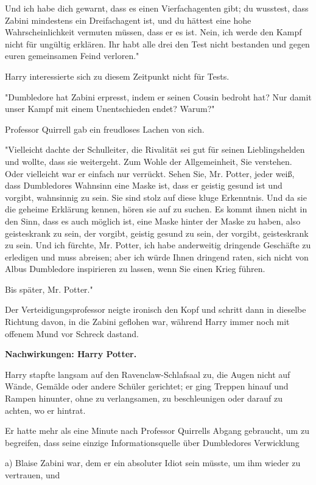 {Und ich habe dich gewarnt, dass es einen Vierfachagenten gibt; du wusstest, dass Zabini mindestens ein Dreifachagent ist, und du hättest eine hohe Wahrscheinlichkeit vermuten müssen, dass er es ist. Nein, ich werde den Kampf nicht für ungültig erklären. Ihr habt alle drei den Test nicht bestanden und gegen euren gemeinsamen Feind verloren."

Harry interessierte sich zu diesem Zeitpunkt nicht für Tests.

"Dumbledore hat Zabini erpresst, indem er seinen Cousin bedroht hat? Nur damit unser Kampf mit einem Unentschieden endet? Warum?"

Professor Quirrell gab ein freudloses Lachen von sich.

"Vielleicht dachte der Schulleiter, die Rivalität sei gut für seinen Lieblingshelden und wollte, dass sie weitergeht. Zum Wohle der Allgemeinheit, Sie verstehen. Oder vielleicht war er einfach nur verrückt. Sehen Sie, Mr. Potter, jeder weiß, dass Dumbledores Wahnsinn eine Maske ist, dass er geistig gesund ist und vorgibt, wahnsinnig zu sein. Sie sind stolz auf diese kluge Erkenntnis. Und da sie die geheime Erklärung kennen, hören sie auf zu suchen. Es kommt ihnen nicht in den Sinn, dass es auch möglich ist, eine Maske hinter der Maske zu haben, also geisteskrank zu sein, der vorgibt, geistig gesund zu sein, der vorgibt, geisteskrank zu sein. Und ich fürchte, Mr. Potter, ich habe anderweitig dringende Geschäfte zu erledigen und muss abreisen; aber ich würde Ihnen dringend raten, sich nicht von Albus Dumbledore inspirieren zu lassen, wenn Sie einen Krieg führen.

Bis später, Mr. Potter."

Der Verteidigungsprofessor neigte ironisch den Kopf und schritt dann in dieselbe Richtung davon, in die Zabini geflohen war, während Harry immer noch mit offenem Mund vor Schreck dastand.

\textbf{Nachwirkungen: Harry Potter.}

Harry stapfte langsam auf den Ravenclaw-Schlafsaal zu, die Augen nicht auf Wände, Gemälde oder andere Schüler gerichtet; er ging Treppen hinauf und Rampen hinunter, ohne zu verlangsamen, zu beschleunigen oder darauf zu achten, wo er hintrat.

Er hatte mehr als eine Minute nach Professor Quirrells Abgang gebraucht, um zu begreifen, dass seine einzige Informationsquelle über Dumbledores Verwicklung

a) Blaise Zabini war, dem er ein absoluter Idiot sein müsste, um ihm wieder zu vertrauen, und

}
